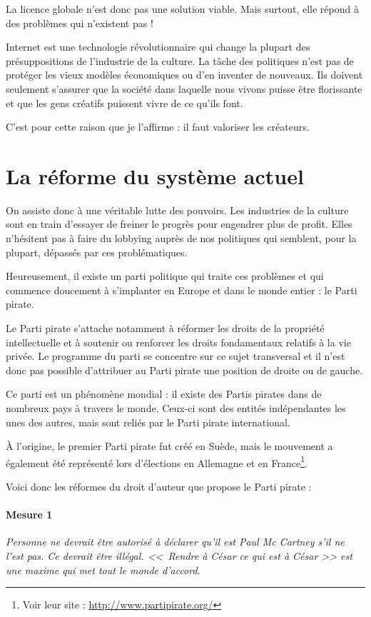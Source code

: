 La licence globale n'est donc pas une solution viable.
Mais surtout, elle répond à des problèmes qui n'existent pas !

Internet est une technologie révolutionnaire qui change la plupart des présuppositions de l'industrie de la culture.
La tâche des politiques n'est pas de protéger les vieux modèles économiques ou d'en inventer de nouveaux.
Ils doivent seulement s'assurer que la société dans laquelle nous vivons puisse être florissante et que les gens créatifs puissent vivre de ce qu'ils font.

C'est pour cette raison que je l'affirme : il faut valoriser les créateurs.

\section{La réforme du système actuel}

On assiste donc à une véritable lutte des pouvoirs.
Les industries de la culture sont en train d'essayer de freiner le progrès pour engendrer plus de profit.
Elles n'hésitent pas à faire du lobbying auprès de nos politiques qui semblent, pour la plupart, dépassés par ces problématiques.

Heureusement, il existe un parti politique qui traite ces problèmes et qui commence doucement à s'implanter en Europe et dans le monde entier : le Parti pirate.

Le Parti pirate s'attache notamment à réformer les droits de la propriété intellectuelle et à soutenir ou renforcer les droits fondamentaux relatifs à la vie privée.
Le programme du parti se concentre sur ce sujet transversal et il n'est donc pas possible d'attribuer au Parti pirate une position de droite ou de gauche.

Ce parti est un phénomène mondial : il existe des Partis pirates dans de nombreux pays à travers le monde.
Ceux-ci sont des entités indépendantes les unes des autres, mais sont reliés par le Parti pirate international.

À l'origine, le premier Parti pirate fut créé en Suède, mais le mouvement a également été représenté lors d'élections en Allemagne et en France\footnote{Voir leur site : \url{http://www.partipirate.org/}}.

Voici donc les réformes du droit d'auteur que propose le Parti pirate :

\paragraph{Mesure 1}
\textit{Personne ne devrait être autorisé à déclarer qu'il est Paul Mc Cartney s'il ne l'est pas.
Ce devrait être illégal.
<<~Rendre à César ce qui est à César >> est une maxime qui met tout le monde d'accord.}

